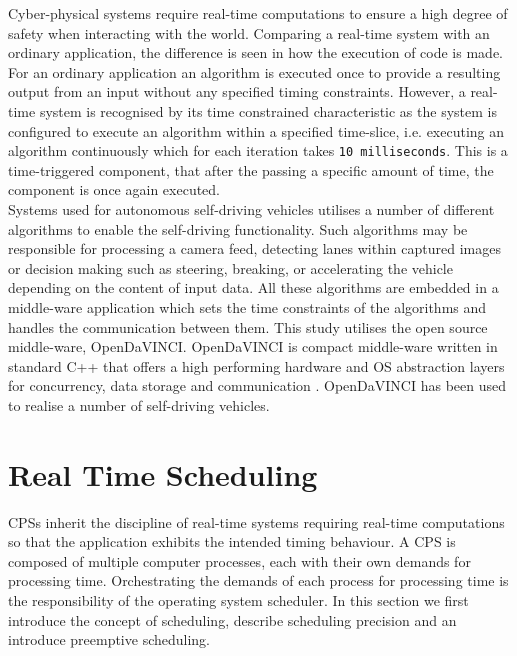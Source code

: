Cyber-physical systems require real-time computations to ensure a high degree of safety when interacting with the world. Comparing a real-time system with an ordinary application, the difference is seen in how the execution of code is made. For an ordinary application an algorithm is executed once to provide a resulting output from an input without any specified timing constraints. However, a real-time system is recognised by its time constrained characteristic as the system is configured to execute an algorithm within a specified time-slice, i.e. executing an algorithm continuously which for each iteration takes \texttt{10 milliseconds}. This is a time-triggered component, that after the passing a specific amount of time, the component is once again executed. \\

Systems used for autonomous self-driving vehicles utilises a number of different algorithms to enable the self-driving functionality. Such algorithms may be responsible for processing a camera feed, detecting lanes within captured images or decision making such as steering, breaking, or accelerating the vehicle depending on the content of input data. All these algorithms are embedded in a middle-ware application which sets the time constraints of the algorithms and handles the communication between them. This study utilises the open source middle-ware, OpenDaVINCI. OpenDaVINCI is compact middle-ware written in standard C++ that offers a high performing hardware and OS abstraction layers for concurrency, data storage and communication \cite{OpenDaVINCI}. OpenDaVINCI has been used to realise a number of self-driving vehicles.


\section{Real Time Scheduling}


CPSs inherit the discipline of real-time systems requiring real-time computations so that the application exhibits the intended timing behaviour. A CPS is composed of multiple computer processes, each with their own demands for processing time. Orchestrating the demands of each process for processing time is the responsibility of the operating system scheduler. In this section we first introduce the concept of scheduling, describe scheduling precision and an introduce preemptive scheduling. 

